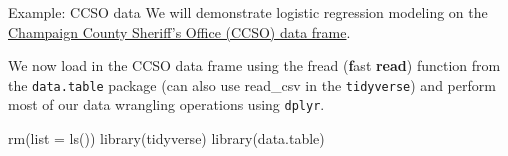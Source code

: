 \documentclass[
  ignorenonframetext,
]{beamer}
\newenvironment{Shaded}{\begin{snugshade}}{\end{snugshade}}
\newcommand{\AttributeTok}[1]{\textcolor[rgb]{0.77,0.63,0.00}{#1}}
\newcommand{\FunctionTok}[1]{\textcolor[rgb]{0.00,0.00,0.00}{#1}}
\newcommand{\NormalTok}[1]{#1}
\begin{document}
\begin{frame}[fragile]{Example: CCSO data}
\protect\hypertarget{example-ccso-data}{}
We will demonstrate logistic regression modeling on the
\href{https://github.com/CUHackNight/JailData}{Champaign County
Sheriff's Office (CCSO) data frame}.

\vspace{12pt}

We now load in the CCSO data frame using the fread (\textbf{f}ast
\textbf{read}) function from the \texttt{data.table} package (can also
use read\_csv in the \texttt{tidyverse}) and perform most of our data
wrangling operations using \texttt{dplyr}.

\vspace{12pt}

\begin{Shaded}
\begin{Highlighting}[]
\FunctionTok{rm}\NormalTok{(}\AttributeTok{list =} \FunctionTok{ls}\NormalTok{())}
\FunctionTok{library}\NormalTok{(tidyverse)}
\FunctionTok{library}\NormalTok{(data.table)}
\end{Highlighting}
\end{Shaded}
\end{frame}
\end{document}
